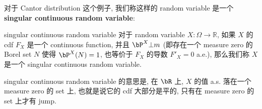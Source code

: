 对于 Cantor distribution 这个例子, 我们称这样的 random variable 是一个 \textbf{singular continuous random variable}:
\begin{definition}{singular continuous random variable}
    对于 random variable \(X: \Omega \to \mathbb{R}\), 
    如果 \(X\) 的 cdf \(F_X\) 是一个 continuous function, 
    并且 \(\bP^X \bot m\) (即存在一个 measure zero 的 Borel set \(N\) 使得 \(\bP^X(N) = 1\), 也等价于
     \(F_X\) 的导数 \(F'_X = 0\) a.e.), 那么我们称 \(X\) 是一个 singular continuous random variable.
\end{definition}
\begin{remark}
    singular continuous random variable 的意思是, 在 \(\bR\) 上, \(X\) 的值 a.s. 
    落在一个 measure zero 的 set 上, 也就是说它的 cdf 大部分是平的, 
    只有在 measure zero 的 set 上才有 jump.
\end{remark}
